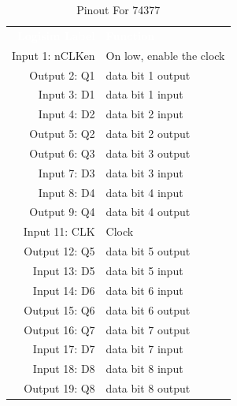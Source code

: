\begin{table}[H]
	\sffamily
	\newcommand{\head}[1]{\textcolor{white}{\textbf{#1}}}		
	\begin{center}
		\begin{tabular}{rl} 
			\rowcolor{black!75}
			\head{Logisim Label} & \head{Function} \\
			Input 1: nCLKen & On low, enable the clock \\
			Output 2: Q1    & data bit 1 output    \\
			Input 3: D1     & data bit 1 input     \\
			Input 4: D2     & data bit 2 input     \\
			Output 5: Q2    & data bit 2 output    \\
			Output 6: Q3    & data bit 3 output    \\
			Input 7: D3     & data bit 3 input     \\
			Input 8: D4     & data bit 4 input     \\
			Output 9: Q4    & data bit 4 output    \\
			Input 11: CLK   & Clock                \\
			Output 12: Q5   & data bit 5 output    \\
			Input 13: D5    & data bit 5 input     \\
			Input 14: D6    & data bit 6 input     \\
			Output 15: Q6   & data bit 6 output    \\
			Output 16: Q7   & data bit 7 output    \\
			Input 17: D7    & data bit 7 input     \\
			Input 18: D8    & data bit 8 input     \\
			Output 19: Q8   & data bit 8 output    \\
		\end{tabular}
	\end{center}
	\caption{Pinout For 74377}
	\label{tab:50-74377}
\end{table}


